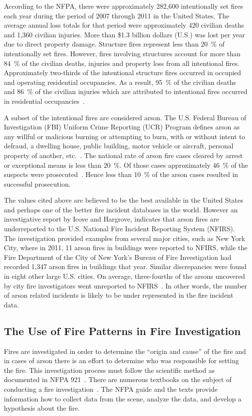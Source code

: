 \documentclass[twoside]{uocthesis}
\begin{document}
According to the NFPA, there were approximately 282,600 intentionally set fires each year during the period of 2007 through 2011 in the United States. The average annual loss totals for that period were approximately 420 civilian deaths and 1,360 civilian injuries. More than \$1.3 billion dollars (U.S.) was lost per year due to direct property damage. Structure fires represent less than 20~\% of intentionally set fires.  However, fires involving structures account for more than 84~\% of the civilian deaths, injuries and property loss from all intentional fires.  Approximately two-thirds of the intentional structure fires occurred in occupied and operating residential occupancies.  As a result, 95~\% of the civilian deaths and 86~\% of the civilian injuries which are attributed to intentional fires occurred in residential occupancies~\cite{Campbell:2014}.

A subset of the intentional fires are considered arson.  The U.S. Federal Bureau of Investigation (FBI) Uniform Crime Reporting (UCR) Program defines arson as any willful or malicious burning or attempting to burn, with or without intent to defraud, a dwelling house, public building, motor vehicle or aircraft, personal property of another, etc.~\cite{Crime:2010}.  The national rate of arson fire cases cleared by arrest or exceptional means is less than 20~\%.  Of those cases approximately 46~\% of the suspects were prosecuted~\cite{Campbell:2014}.  Hence less than 10~\% of the arson cases resulted in successful prosecution.   

The values cited above are believed to be the best available in the United States and perhaps one of the better fire incident databases in the world.  However an investigative report by Icove and Hargrove, indicates that arson fires are underreported to the U.S. National Fire Incident Reporting System (NFIRS).  The investigation provided examples from several major cities, such as New York City, where in 2011, 11 arson fires in buildings were reported to NFIRS, while the Fire Department of the City of New York's Bureau of Fire Investigation had recorded 1,347 arson fires in buildings that year.  Similar discrepancies were found in eight other large U.S. cities.  On average, three-fourths of the arsons uncovered by city fire investigators went unreported to NFIRS~\cite{Icove_2014}.  In other words, the number of arson related incidents is likely to be under represented in the fire incident data.  

\subsection{The Use of Fire Patterns in Fire Investigation}
Fires are investigated in order to determine the ``origin and cause'' of the fire and in cases of arson there is an effort to determine who was responsible for setting the fire.  This investigation process must follow the scientific method as documented in NFPA 921~\cite{NFPA:921}.  There are numerous textbooks on the subject of conducting a fire investigation~\cite{Almirall:2004,Fire_Investigation,DeHaan:2012,Icove:2013,Lentini:2006,Noon:1995}. The NFPA guide and the texts provide information how to collect data from the scene, analyze the data, and develop a hypothesis about the fire.
\end{document}
